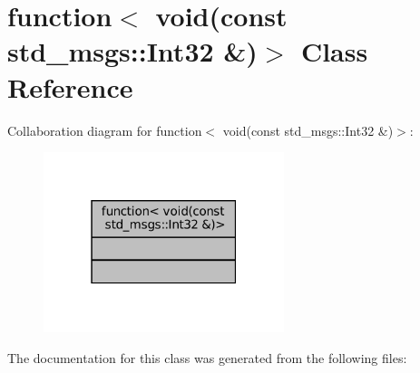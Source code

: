 \hypertarget{classstd_1_1function_3_01void_07const_01std__msgs_1_1Int32_01_6_08_4}{}\section{function$<$ void(const std\+\_\+msgs\+:\+:Int32 \&)$>$ Class Reference}
\label{classstd_1_1function_3_01void_07const_01std__msgs_1_1Int32_01_6_08_4}


Collaboration diagram for function$<$ void(const std\+\_\+msgs\+:\+:Int32 \&)$>$\+:
\nopagebreak
\begin{figure}[H]
\begin{center}
\leavevmode
\includegraphics[width=199pt]{classstd_1_1function_3_01void_07const_01std__msgs_1_1Int32_01_6_08_4__coll__graph}
\end{center}
\end{figure}


The documentation for this class was generated from the following files\+: